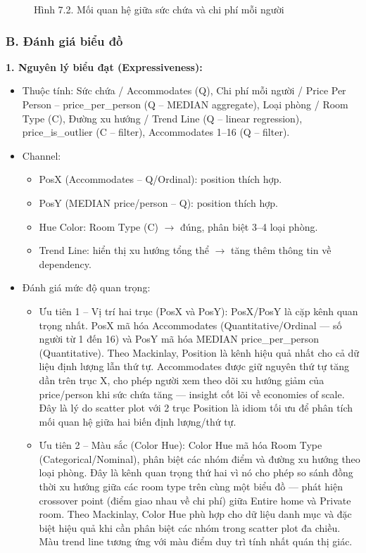 \begin{figure}[H]
    \centering
    \caption{Hình 7.2. Mối quan hệ giữa sức chứa và chi phí mỗi người}
    \label{fig:domain-task7-chart2}
\end{figure}

\subsubsection*{B. Đánh giá biểu đồ}

\textbf{1. Nguyên lý biểu đạt (Expressiveness):}

\begin{itemize}
    \item Thuộc tính: Sức chứa / Accommodates (Q), Chi phí mỗi người / Price Per Person -- price\_per\_person (Q -- MEDIAN aggregate), Loại phòng / Room Type (C), Đường xu hướng / Trend Line (Q -- linear regression), price\_is\_outlier (C -- filter), Accommodates 1--16 (Q -- filter).
    \item Channel:
    \begin{itemize}
        \item PosX (Accommodates -- Q/Ordinal): position thích hợp.
        \item PosY (MEDIAN price/person -- Q): position thích hợp.
        \item Hue Color: Room Type (C) $\rightarrow$ đúng, phân biệt 3--4 loại phòng.
        \item Trend Line: hiển thị xu hướng tổng thể $\rightarrow$ tăng thêm thông tin về dependency.
    \end{itemize}
    \item Đánh giá mức độ quan trọng:
    \begin{itemize}
        \item Ưu tiên 1 -- Vị trí hai trục (PosX và PosY): PosX/PosY là cặp kênh quan trọng nhất. PosX mã hóa Accommodates (Quantitative/Ordinal --- số người từ 1 đến 16) và PosY mã hóa MEDIAN price\_per\_person (Quantitative). Theo Mackinlay, Position là kênh hiệu quả nhất cho cả dữ liệu định lượng lẫn thứ tự. Accommodates được giữ nguyên thứ tự tăng dần trên trục X, cho phép người xem theo dõi xu hướng giảm của price/person khi sức chứa tăng --- insight cốt lõi về economies of scale. Đây là lý do scatter plot với 2 trục Position là idiom tối ưu để phân tích mối quan hệ giữa hai biến định lượng/thứ tự.
        \item Ưu tiên 2 -- Màu sắc (Color Hue): Color Hue mã hóa Room Type (Categorical/Nominal), phân biệt các nhóm điểm và đường xu hướng theo loại phòng. Đây là kênh quan trọng thứ hai vì nó cho phép so sánh đồng thời xu hướng giữa các room type trên cùng một biểu đồ --- phát hiện crossover point (điểm giao nhau về chi phí) giữa Entire home và Private room. Theo Mackinlay, Color Hue phù hợp cho dữ liệu danh mục và đặc biệt hiệu quả khi cần phân biệt các nhóm trong scatter plot đa chiều. Màu trend line tương ứng với màu điểm duy trì tính nhất quán thị giác.

\end{itemize}
\end{itemize}
